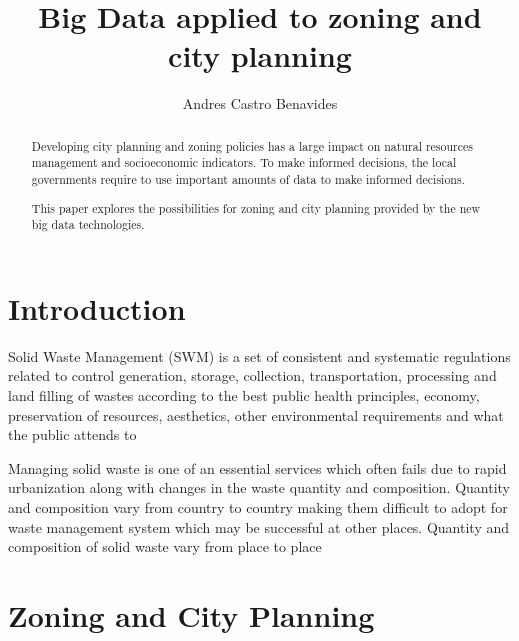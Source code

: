 \documentclass[sigconf]{acmart}
\begin{document}
\title{Big Data applied to zoning and city planning}

\author{Andres Castro Benavides}

\renewcommand{\shortauthors}{B. Trovato et al.}


\begin{abstract}
Developing city planning and zoning policies has a large impact on natural resources management and socioeconomic indicators. To make informed decisions, the local governments require to use important amounts of data to make informed decisions.

This paper explores the possibilities for zoning and city planning provided by the new big data technologies.

\end{abstract}




\maketitle

\section{Introduction}

Solid Waste Management (SWM) is a set of consistent and systematic regulations related to control generation, storage, collection, transportation, processing and land filling of wastes according to the best public health principles, economy, preservation of resources, aesthetics, other environmental requirements and what the public attends to ~\cite{akbarpour2016}

Managing solid waste is one of an essential services which often fails due to
rapid urbanization along with changes in the waste quantity and composition.
Quantity and composition vary from country to country making them difficult to
adopt for waste management system which may be successful at other places.
Quantity and composition of solid waste vary from place to place ~\cite{chandrappa2012} 


\section{ Zoning and City Planning}
\end{document}
